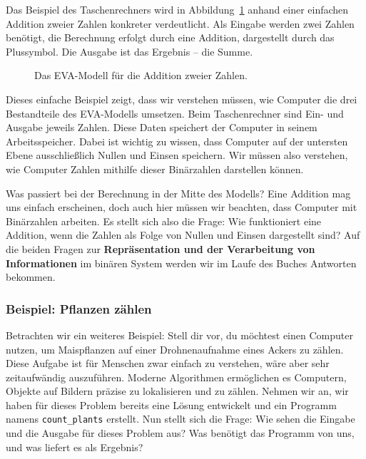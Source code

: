 \documentclass[
  letterpaper,
  DIV=11]{scrreprt}
\begin{document}
Das Beispiel des Taschenrechners wird in
Abbildung~\ref{fig-example-calculator} anhand einer einfachen Addition
zweier Zahlen konkreter verdeutlicht. Als Eingabe werden zwei Zahlen
benötigt, die Berechnung erfolgt durch eine Addition, dargestellt durch
das Plussymbol. Die Ausgabe ist das Ergebnis -- die Summe.

\begin{figure}


\caption{\label{fig-example-calculator}Das EVA-Modell für die Addition
zweier Zahlen.}

\end{figure}%

Dieses einfache Beispiel zeigt, dass wir verstehen müssen, wie Computer
die drei Bestandteile des EVA-Modells umsetzen. Beim Taschenrechner sind
Ein- und Ausgabe jeweils Zahlen. Diese Daten speichert der Computer in
seinem Arbeitsspeicher. Dabei ist wichtig zu wissen, dass Computer auf
der untersten Ebene ausschließlich Nullen und Einsen speichern. Wir
müssen also verstehen, wie Computer Zahlen mithilfe dieser Binärzahlen
darstellen können.

Was passiert bei der Berechnung in der Mitte des Modells? Eine Addition
mag uns einfach erscheinen, doch auch hier müssen wir beachten, dass
Computer mit Binärzahlen arbeiten. Es stellt sich also die Frage: Wie
funktioniert eine Addition, wenn die Zahlen als Folge von Nullen und
Einsen dargestellt sind? Auf die beiden Fragen zur
\textbf{Repräsentation und der Verarbeitung von Informationen} im
binären System werden wir im Laufe des Buches Antworten bekommen.

\subsubsection{Beispiel: Pflanzen
zählen}\label{beispiel-pflanzen-zuxe4hlen}

Betrachten wir ein weiteres Beispiel: Stell dir vor, du möchtest einen
Computer nutzen, um Maispflanzen auf einer Drohnenaufnahme eines Ackers
zu zählen. Diese Aufgabe ist für Menschen zwar einfach zu verstehen,
wäre aber sehr zeitaufwändig auszuführen. Moderne Algorithmen
ermöglichen es Computern, Objekte auf Bildern präzise zu lokalisieren
und zu zählen. Nehmen wir an, wir haben für dieses Problem bereits eine
Lösung entwickelt und ein Programm namens \texttt{count\_plants}
erstellt. Nun stellt sich die Frage: Wie sehen die Eingabe und die
Ausgabe für dieses Problem aus? Was benötigt das Programm von uns, und
was liefert es als Ergebnis?
\end{document}
